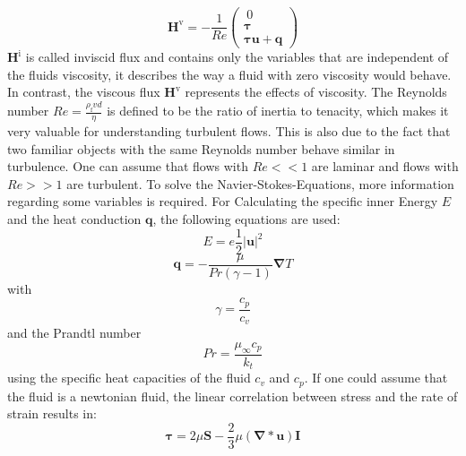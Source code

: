 \documentclass[a4paper,10pt]{article}
\renewcommand*\vec[1]{\boldsymbol{#1}}
\renewcommand*\matrix[1]{\boldsymbol{#1}}
\numberwithin{equation}{section} %
\begin{document}
\begin{equation}
 \vec{H^\mathrm{v}} = - \frac{1}{Re} \left( \begin{array}{c}\ 0 \\ \matrix{\tau}\\ \matrix{\tau} \vec{u} + \vec{q} \end{array} \right)
\end{equation}
\nomenclature{$\matrix{\tau}$}{Stress tensor}
\nomenclature{$\vec{q}$}{Heat conduction}
$ \vec{H^\mathrm{i}} $ is called inviscid flux and contains only the variables that are independent of the fluids viscosity, it describes the way a fluid 
with zero viscosity would behave. In contrast, the viscous flux $ \vec{H^\mathrm{v}} $ represents the effects of viscosity. The Reynolds number 
$ Re = \frac{\rho_\mathrm{f} v d}{\eta} $ is defined to be the ratio of inertia to tenacity, which makes it very valuable for understanding turbulent flows. This is also due to the 
fact that two familiar objects with the same Reynolds number behave similar in turbulence. One can assume that flows with $ Re << 1 $ are laminar and flows with 
$ Re >> 1 $ are turbulent.
To solve the Navier-Stokes-Equations, more information regarding some variables is required. For Calculating the specific inner Energy $ E $ 
and the heat conduction $ \vec{q} $, the following equations are used:
\begin{equation}
 E = e  \frac{1}{2} \vec{|u|}^2
\end{equation}
\begin{equation}
 \vec{q} = - \frac{\mu}{Pr (\gamma - 1)} \vec\nabla T
\end{equation}
with 
\begin{equation}
 \gamma = \frac{c_p}{c_v}
\end{equation}
and the Prandtl number
\begin{equation}
 Pr = \frac{\mu_\infty c_p}{k_t}
\end{equation}
using the specific heat capacities of the fluid $ c_v $ and $ c_p $.
If one could assume that the fluid is a newtonian fluid, the linear correlation between stress and the rate of strain results in:
\begin{equation}
 \matrix{\tau} = 2 \mu \matrix{S} - \frac{2}{3} \mu (\vec\nabla * \vec{u}) \matrix{I}
\end{equation}
\end{document}
